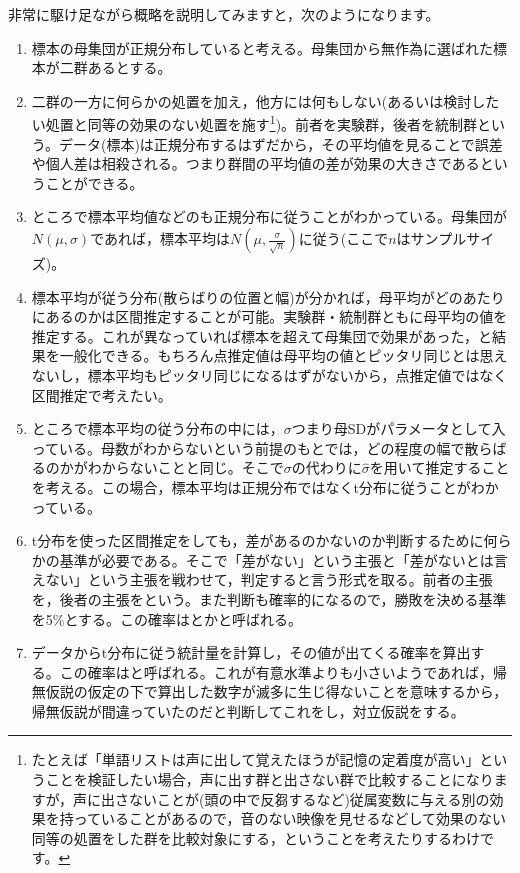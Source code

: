 \documentclass{ltjsbook}
\begin{document}
非常に駆け足ながら概略を説明してみますと，次のようになります。
\begin{enumerate}
	\item 標本の母集団が正規分布していると考える。母集団から無作為に選ばれた標本が二群あるとする。
	\item 二群の一方に何らかの処置を加え，他方には何もしない(あるいは検討したい処置と同等の効果のない処置を施す\footnote{たとえば「単語リストは声に出して覚えたほうが記憶の定着度が高い」ということを検証したい場合，声に出す群と出さない群で比較することになりますが，声に出さないことが(頭の中で反芻するなど)従属変数に与える別の効果を持っていることがあるので，音のない映像を見せるなどして効果のない同等の処置をした群を比較対象にする，ということを考えたりするわけです。})。前者を実験群，後者を統制群という。データ(標本)は正規分布するはずだから，その平均値を見ることで誤差や個人差は相殺される。つまり群間の平均値の差が効果の大きさであるということができる。
	\item ところで標本平均値などのも正規分布に従うことがわかっている。母集団が$N(\mu,\sigma)$であれば，標本平均は$N(\mu, \frac{\sigma}{\sqrt{n}})$に従う(ここで$n$はサンプルサイズ)。
	\item 標本平均が従う分布(散らばりの位置と幅)が分かれば，母平均がどのあたりにあるのかは区間推定することが可能。実験群・統制群ともに母平均の値を推定する。これが異なっていれば標本を超えて母集団で効果があった，と結果を一般化できる。もちろん点推定値は母平均の値とピッタリ同じとは思えないし，標本平均もピッタリ同じになるはずがないから，点推定値ではなく区間推定で考えたい。
	\item ところで標本平均の従う分布の中には，$\sigma$つまり母SDがパラメータとして入っている。母数がわからないという前提のもとでは，どの程度の幅で散らばるのかがわからないことと同じ。そこで$\sigma$の代わりに$\hat{\sigma}$を用いて推定することを考える。この場合，標本平均は正規分布ではなくt分布に従うことがわかっている。
	\item t分布を使った区間推定をしても，差があるのかないのか判断するために何らかの基準が必要である。そこで「差がない」という主張と「差がないとは言えない」という主張を戦わせて，判定すると言う形式を取る。前者の主張を，後者の主張をという。また判断も確率的になるので，勝敗を決める基準を5\%とする。この確率はとかと呼ばれる。
	\item データからt分布に従う統計量を計算し，その値が出てくる確率を算出する。この確率はと呼ばれる。これが有意水準よりも小さいようであれば，帰無仮説の仮定の下で算出した数字が滅多に生じ得ないことを意味するから，帰無仮説が間違っていたのだと判断してこれをし，対立仮説をする。
\end{enumerate}
\end{document}
